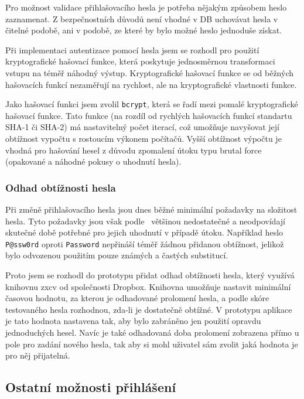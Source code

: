 Pro možnost validace přihlašovacího hesla je potřeba nějakým způsobem heslo zaznamenat.
Z bezpečnostních důvodů není vhodné v DB uchovávat hesla v čitelné podobě, ani v podobě, ze které by bylo možné heslo jednoduše získat.

Při implementaci autentizace pomocí hesla jsem se rozhodl pro použití kryptografické hašovací funkce, která poskytuje jednosměrnou transformaci vstupu na téměř náhodný výstup.
Kryptografické hašovací funkce se od běžných hašovacích funkcí nezaměřují na rychlost, ale na kryptografické vlastnosti funkce.

Jako hašovací funkci jsem zvolil \texttt{bcrypt}, která se řadí mezi pomalé kryptografické hašovací funkce.
Tato funkce (na rozdíl od rychlých hašovacích funkcí standartu SHA-1 či SHA-2) má nastavitelný počet iterací, což umožňuje navyšovat její obtížnost vypočtu s rostoucím výkonem počítačů.
Vyšší obtížnost výpočtu je vhodná pro hašování hesel z důvodu zpomalení útoku typu brutal force (opakované a náhodné pokusy o uhodnutí hesla).

\subsubsection{Odhad obtížnosti hesla}

Při změně přihlašovacího hesla jsou dnes běžné minimální požadavky na složitost hesla.
Tyto požadavky jsou však podle~\cite{dropbox:zxcv} většinou nedostatečné a neodpovídají skutečné době potřebné pro jejich uhodnutí v případě útoku.
Například heslo \texttt{P@ssw0rd} oproti \texttt{Password} nepřináší téměř žádnou přidanou obtížnost, jelikož bylo odvozenou použitím pouze známých a častých substitucí.

Proto jsem se rozhodl do prototypu přidat odhad obtížnosti hesla, který využívá knihovnu zxcv od společnosti Dropbox.
Knihovna umožňuje nastavit minimální časovou hodnotu, za kterou je odhadované prolomení hesla, a podle skóre testovaného hesla rozhodnou, zda-li je dostatečně obtížné.
V prototypu aplikace je tato hodnota nastavena tak, aby bylo zabráněno jen použití opravdu jednoduchých hesel.
Navíc je také odhadovaná doba prolomení zobrazena přímo u pole pro zadání nového hesla, tak aby si mohl uživatel sám zvolit jaká hodnota je pro něj přijatelná.

\subsection{Ostatní možnosti přihlášení}\label{subsec:ostatníMožnostiPřihlášení}

